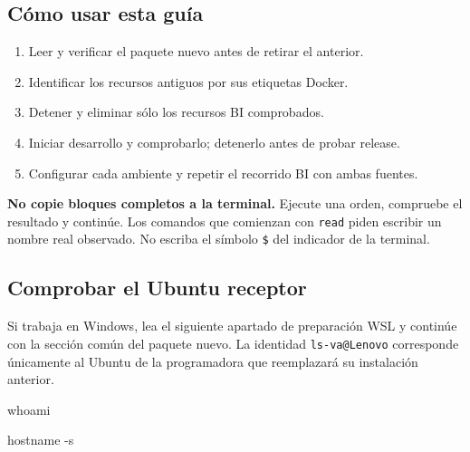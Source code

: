 \documentclass[
  spanish,
  10pt,
  a4paper,
]{article}
\newenvironment{Shaded}{}{}
\newcommand{\AttributeTok}[1]{#1}
\newcommand{\BuiltInTok}[1]{#1}
\newcommand{\FunctionTok}[1]{#1}
\newcommand{\StringTok}[1]{#1}
\newcommand{\VariableTok}[1]{#1}
\providecommand{\tightlist}{%
  \setlength{\itemsep}{0pt}\setlength{\parskip}{0pt}}
\renewenvironment{Shaded}{\begin{snugshade}}{\end{snugshade}}%
\begin{document}
\subsection{Cómo usar esta guía}\label{cuxf3mo-usar-esta-guuxeda}

\begin{enumerate}
\def\labelenumi{\arabic{enumi}.}
\tightlist
\item
  Leer y verificar el paquete nuevo antes de retirar el anterior.
\item
  Identificar los recursos antiguos por sus etiquetas Docker.
\item
  Detener y eliminar sólo los recursos BI comprobados.
\item
  Iniciar desarrollo y comprobarlo; detenerlo antes de probar release.
\item
  Configurar cada ambiente y repetir el recorrido BI con ambas fuentes.
\end{enumerate}

\textbf{No copie bloques completos a la terminal.} Ejecute una orden,
compruebe el resultado y continúe. Los comandos que comienzan con
\texttt{read} piden escribir un nombre real observado. No escriba el
símbolo \texttt{\$} del indicador de la terminal.

\subsection{Comprobar el Ubuntu
receptor}\label{comprobar-el-ubuntu-receptor}

Si trabaja en Windows, lea el siguiente apartado de preparación WSL y
continúe con la sección común del paquete nuevo. La identidad
\texttt{ls-va@Lenovo} corresponde únicamente al Ubuntu de la
programadora que reemplazará su instalación anterior.

\begin{Shaded}
\begin{Highlighting}[]
\FunctionTok{whoami}
\end{Highlighting}
\end{Shaded}

\begin{Shaded}
\end{Shaded}

\begin{Shaded}
\begin{Highlighting}[]
\FunctionTok{hostname} \AttributeTok{{-}s}
\end{Highlighting}
\end{Shaded}
\end{document}
